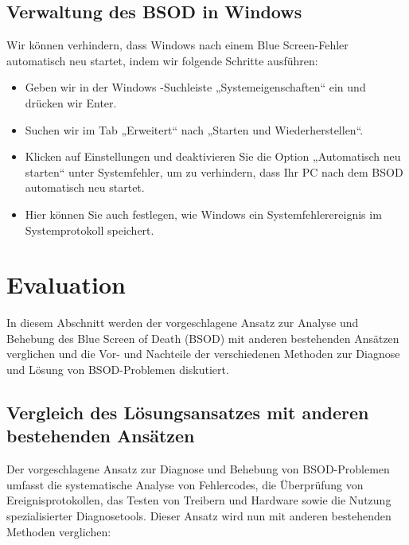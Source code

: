 \documentclass[paper=a4,fontsize=12pt,ngerman,parskip=half]{scrartcl}
\begin{document}
\subsection{Verwaltung des BSOD in Windows}

Wir können verhindern, dass Windows nach einem Blue Screen-Fehler automatisch neu startet, indem wir folgende Schritte ausführen:
\begin{itemize}
  \item Geben wir in der Windows -Suchleiste „Systemeigenschaften“ ein und drücken wir Enter.
  \item Suchen wir im Tab „Erweitert“ nach „Starten und Wiederherstellen“.
  \item Klicken auf Einstellungen und deaktivieren Sie die Option „Automatisch neu starten“ unter Systemfehler, um zu verhindern, dass Ihr PC nach dem BSOD automatisch neu startet.
  \item Hier können Sie auch festlegen, wie Windows ein Systemfehlerereignis im Systemprotokoll speichert.\cite{microsoft_support}
\end{itemize}

\section{Evaluation}

In diesem Abschnitt werden der vorgeschlagene Ansatz zur Analyse und Behebung des Blue Screen of Death (BSOD) mit anderen bestehenden Ansätzen verglichen und die Vor- und Nachteile der verschiedenen Methoden zur Diagnose und Lösung von BSOD-Problemen diskutiert.

\subsection{Vergleich des Lösungsansatzes mit anderen bestehenden Ansätzen}

Der vorgeschlagene Ansatz zur Diagnose und Behebung von BSOD-Problemen umfasst die systematische Analyse von Fehlercodes, die Überprüfung von Ereignisprotokollen, das Testen von Treibern und Hardware sowie die Nutzung spezialisierter Diagnosetools. Dieser Ansatz wird nun mit anderen bestehenden Methoden verglichen:
\end{document}

